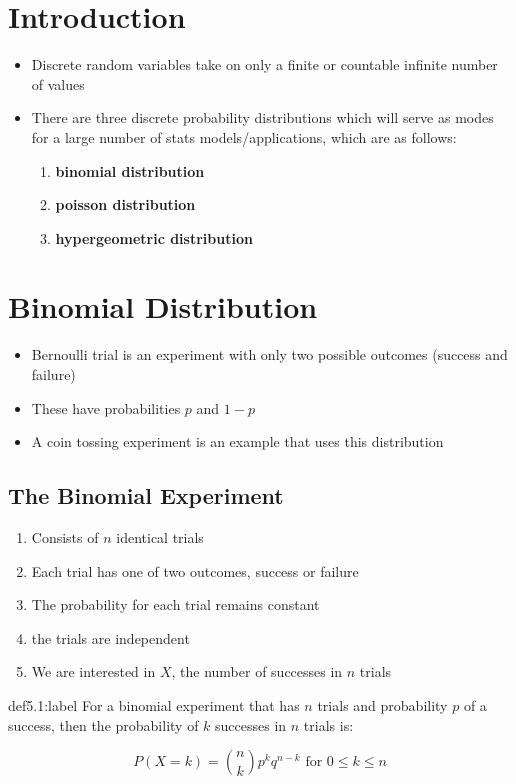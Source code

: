 \section{Introduction}

\begin{itemize}
    \item Discrete random variables take on only a finite or countable infinite number of values
    \item There are three discrete probability distributions which will serve as modes for a large number of stats models/applications, which are as follows:
    \begin{enumerate}
        \item \bf{binomial} distribution
        \item \bf{poisson} distribution
        \item \bf{hypergeometric} distribution
    \end{enumerate}
\end{itemize}

\section{Binomial Distribution}

\begin{itemize}
    \item Bernoulli trial is an experiment with only two possible outcomes (success and failure)
    \item These have probabilities $p$ and $1-p$
    \item A coin tossing experiment is an example that uses this distribution 
\end{itemize}

\subsection{The Binomial Experiment}

\begin{enumerate}
    \item Consists of $n$ identical trials
    \item Each trial has one of two outcomes, success or failure
    \item The probability for each trial remains constant
    \item the trials are independent
    \item We are interested in $X$, the number of successes in $n$ trials
\end{enumerate}\newpage

\begin{definition}{def5.1:label}
    For a binomial experiment that has $n$ trials and probability $p$ of a success, then the probability of $k$ successes in $n$ trials is:

    $$
    P(X = k) = \binom{n}{k}p^kq^{n-k} \text{ for } 0 \le k \le n
    $$
\end{definition}